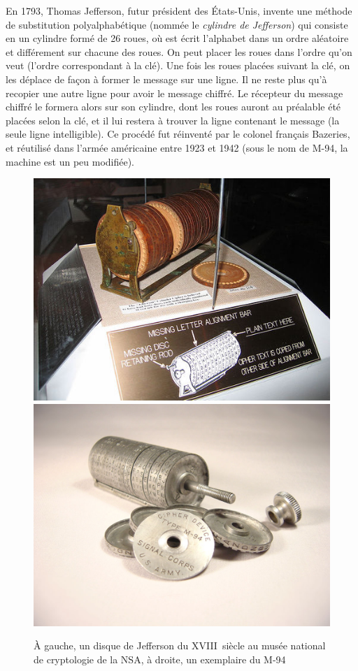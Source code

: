 En 1793, Thomas Jefferson, futur président des États-Unis,
invente une méthode de substitution polyalphabétique (nommée le
\emph{cylindre de Jefferson}) qui consiste en
un cylindre formé de 26 roues, où est écrit l'alphabet dans un ordre
aléatoire et différement sur chacune des roues. On peut placer les
roues dans l'ordre qu'on veut (l'ordre correspondant à la clé).
Une fois les roues placées suivant la clé, on les déplace de façon à
former le message sur une ligne. Il ne reste plus qu'à recopier une
autre ligne pour avoir le message chiffré. Le récepteur du message
chiffré le formera alors sur son cylindre, dont les roues auront au
préalable été placées selon la clé, et il lui restera à trouver la
ligne contenant le message (la seule ligne intelligible). Ce procédé
fut réinventé par le colonel français Bazeries, et réutilisé
dans l'armée américaine entre 1923 et 1942 (sous le nom de M-94, la
machine est un peu modifiée).

\begin{figure}[h]
  \begin{center}
    \includegraphics[scale=0.4]{images/JeffersonDisk.jpg}
    \hfill
    \includegraphics[scale=0.20]{images/M94.jpg}
  \end{center}
  \caption{À gauche, un disque de Jefferson du XVIII\ieme~siècle au
    musée national de cryptologie de la NSA, à droite, un exemplaire
    du M-94}
  \label{fig:JeffersonDisk}
\end{figure}

